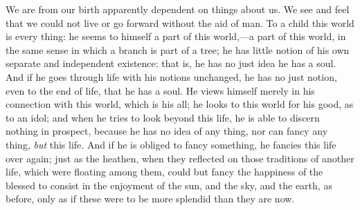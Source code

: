 We are from our birth apparently dependent on things
about us. We see and feel that we could not live or go
forward without the aid of man. To a child this world is every thing: he seems to
himself a part of this
world,—a part of this world, in the same sense in
which a branch is part of a tree; he has little notion of
his own separate and independent existence: that is, he
has no just idea he has a soul. And if he goes through
life with his notions unchanged, he has no just notion,
even to the end of life, that he has a soul. He views
himself merely in his connection with this world, which
is his all; he looks to this world for his good, as to an
idol; and when he tries to look beyond this life, he is
able to discern nothing in prospect, because he has no
idea of any thing, nor can fancy any thing, \emph{but}
this life. And if he is obliged to fancy something, he
fancies this life over again; just as the heathen, when
they reflected on those traditions of another life, which
were floating among them, could but fancy the happiness
of the blessed to consist in the enjoyment of the sun,
and the sky, and the earth, as before, only as if these
were to be more splendid than they are now.

